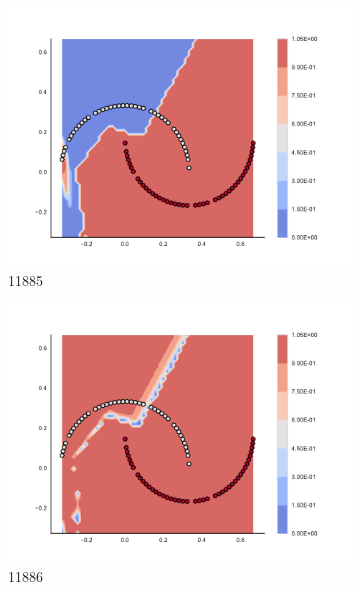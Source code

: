 \begin{figure}[h]
\begin{subfigure}[b]{0.09\textwidth}
    \includegraphics[clip, trim=2.35cm 1.75cm 4.5cm 0cm,width=\textwidth]{img/convergence/11885.pdf}
    \caption{11885}
    \label{fig:convergence_11885}
\end{subfigure}
%
\begin{subfigure}[b]{0.09\textwidth}
    \includegraphics[clip, trim=2.35cm 1.75cm 4.5cm 0cm,width=\textwidth]{img/convergence/11886.pdf}
    \caption{11886}
    \label{fig:convergence_11886}
\end{subfigure}
%
\begin{subfigure}[b]{0.09\textwidth}

\end{subfigure}
\end{figure}
